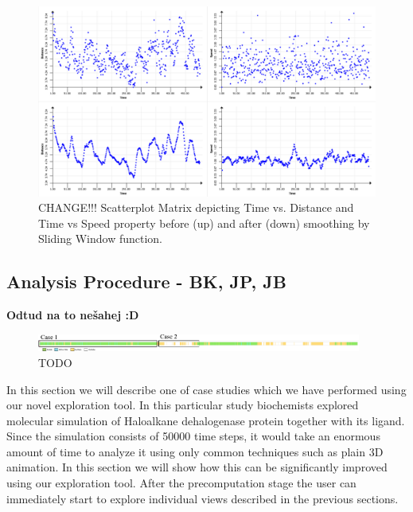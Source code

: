 \documentclass[twocolumn]{bmcart}%
\begin{document}
\begin{figure}[htb]
	\centering
  \includegraphics[width=0.95\linewidth]{img/scatterplot.png}
  \caption{\label{fig:scatterplot} CHANGE!!! Scatterplot Matrix depicting Time vs. Distance and Time vs Speed property before (up) and after (down) smoothing by Sliding Window function.}
\end{figure}

\subsection*{Analysis Procedure - BK, JP, JB}

{\color{red}\textbf{Odtud na to nešahej :D}}

\begin{figure}[htb]
	\centering
  \includegraphics[width=0.95\textwidth]{img/case_overview.pdf}
  \caption{\label{fig:case_overview} {\color{red}TODO}}
\end{figure}

In this section we will describe one of case studies which we have performed using our novel exploration tool.
In this particular study biochemists explored molecular simulation of Haloalkane dehalogenase protein together with its ligand. 
Since the simulation consists of 50000 time steps, it would take an enormous amount of time to analyze it using only common techniques such as plain 3D animation.
In this section we will show how this can be significantly improved using our exploration tool.
After the precomputation stage the user can immediately start to explore individual views described in the previous sections.
\end{document}
